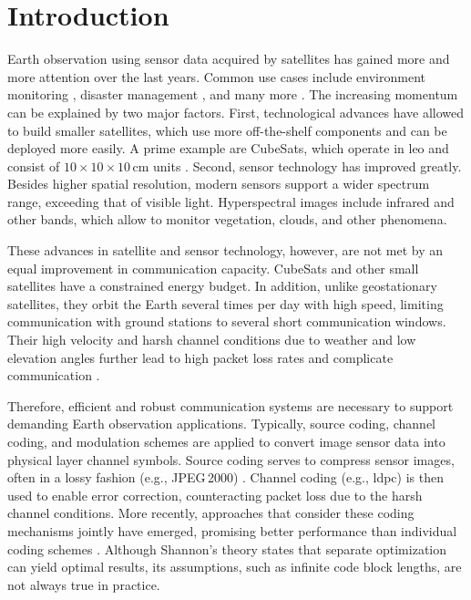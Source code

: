 \documentclass[conference]{IEEEtran}
\newcommand\jpegtwok{JPEG\,2000\xspace}
\begin{document}

\acresetall
\section{Introduction}

Earth observation using sensor data acquired by satellites has gained more and more attention over the last years.
Common use cases include environment monitoring \cite{rs14030589}, disaster management \cite{barmpoutis2020}, and many more \cite{radix,MarCO}.
The increasing momentum can be explained by two major factors.
First, technological advances have allowed to build smaller satellites, which use more off-the-shelf components and can be deployed more easily.
A prime example are CubeSats, which operate in \ac{leo} and consist of $10 \times 10 \times 10$\,cm units \cite{cubesat2020}.
Second, sensor technology has improved greatly.
Besides higher spatial resolution, modern sensors support a wider spectrum range, exceeding that of visible light.
Hyperspectral images include infrared and other bands, which allow to monitor vegetation, clouds, and other phenomena. %

These advances in satellite and sensor technology, however, are not met by an equal improvement in communication capacity.
CubeSats and other small satellites have a constrained energy budget. %
In addition, unlike geostationary satellites, they orbit the Earth several times per day with high speed, limiting communication with ground stations to several short communication windows.
Their high velocity and harsh channel conditions due to weather and low elevation angles further lead to high packet loss rates and complicate communication \cite{nogales2018}.

Therefore, efficient and robust communication systems are necessary to support demanding Earth observation applications.
Typically, source coding, channel coding, and modulation schemes are applied to convert image sensor data into physical layer channel symbols.
Source coding serves to compress sensor images, often in a lossy fashion (e.g., \jpegtwok) \cite{sentinel-2-user-handbook}.
Channel coding (e.g., \ac{ldpc}) is then used to enable error correction, counteracting packet loss due to the harsh channel conditions.
More recently, approaches that consider these coding mechanisms jointly have emerged, promising better performance than individual coding schemes \cite{6408177}.
Although Shannon's theory \cite{cover1991elements} states that separate optimization can yield optimal results, its assumptions, such as infinite code block lengths, are not always true in practice.
\end{document}
